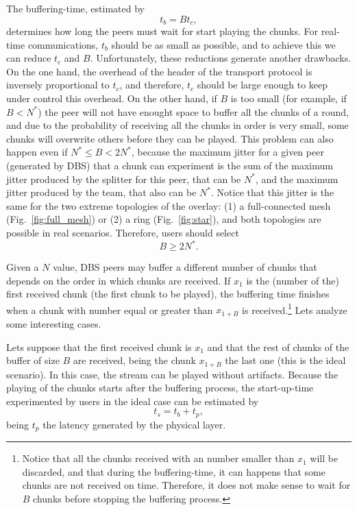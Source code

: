 

\label{sec:buffering_time}
The buffering-time, estimated by
\begin{equation}
  \label{eq:t_b}
  t_b = Bt_c,
\end{equation}
determines how long the peers must wait for start playing the
chunks. For real-time communications, $t_b$ should be as small as
possible, and to achieve this we can reduce $t_c$ and
$B$. Unfortunately, these reductions generate another drawbacks. On
the one hand, the overhead of the header of the transport protocol is
inversely proportional to $t_c$, and therefore, $t_c$ should be large
enough to keep under control this overhead. On the other hand, if $B$
is too small (for example, if $B<N^*$) the peer will not have enought
space to buffer all the chunks of a round, and due to the probability
of receiving all the chunks in order is very small, some chunks will
overwrite others before they can be played. This problem can also
happen even if $N^*\leq B<2N^*$, because the maximum jitter for a
given peer (generated by DBS) that a chunk can experiment is the sum
of the maximum jitter produced by the splitter for this peer, that can
be $N^*$, and the maximum jitter produced by the team, that also can
be $N^*$. Notice that this jitter is the same for the two extreme
topologies of the overlay: (1) a full-connected mesh
(Fig.~\ref{fig:full_mesh}) or (2) a ring (Fig.~\ref{fig:star}), and
both topologies are possible in real scenarios. Therefore, users
should select
\begin{equation}
  \label{eq:minimum_B}
  B\ge 2N^*.
\end{equation}

Given a $N$ value, DBS peers may buffer a different number of chunks
that depends on the order in which chunks are received. If $x_1$ is
the (number of the) first received chunk (the first chunk to be
played), the buffering time finishes when a chunk with number equal or
greater than $x_{1+B}$ is received.\footnote{Notice that all the
  chunks received with an number smaller than $x_1$ will be discarded,
  and that during the buffering-time, it can happens that some chunks
  are not received on time. Therefore, it does not make sense to wait
  for $B$ chunks before stopping the buffering process.} Lets analyze
some interesting cases.

Lets suppose that the first received chunk is $x_1$ and that the rest
of chunks of the buffer of size $B$ are received, being the chunk
$x_{1+B}$ the last one (this is the ideal scenario). In this case, the
stream can be played without artifacts. Because the playing of the
chunks starts after the buffering process, the start-up-time
experimented by users in the ideal case can be estimated by
\begin{equation}
  t_s = t_b + t_p,
  \label{eq:start-up-time}
\end{equation}
being $t_p$ the latency generated by the physical layer.

